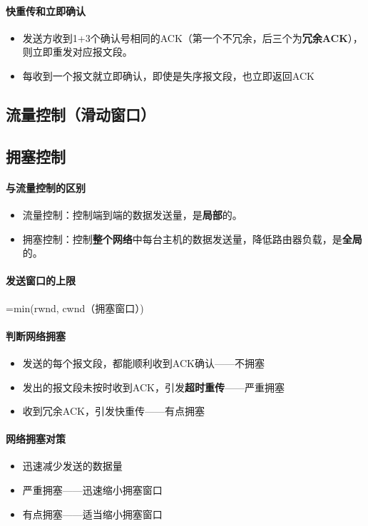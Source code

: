 \paragraph{快重传和立即确认}
\begin{itemize}
    \item 发送方收到1+3个确认号相同的ACK（第一个不冗余，后三个为\textbf{冗余ACK}），则立即重发对应报文段。
    \item 每收到一个报文就立即确认，即使是失序报文段，也立即返回ACK
\end{itemize}


\subsection{流量控制（滑动窗口）}


\subsection{拥塞控制}

\paragraph{与流量控制的区别}
\begin{itemize}
    \item 流量控制：控制端到端的数据发送量，是\textbf{局部}的。
    \item 拥塞控制：控制\textbf{整个网络}中每台主机的数据发送量，降低路由器负载，是\textbf{全局}的。
\end{itemize}

\paragraph{发送窗口的上限}
=min(rwnd, cwnd（拥塞窗口）)

\paragraph{判断网络拥塞}
\begin{itemize}
    \item 发送的每个报文段，都能顺利收到ACK确认——不拥塞
    \item 发出的报文段未按时收到ACK，引发\textbf{超时重传}——严重拥塞
    \item 收到冗余ACK，引发快重传——有点拥塞
\end{itemize}

\paragraph{网络拥塞对策}
\begin{itemize}
    \item 迅速减少发送的数据量
    \item 严重拥塞——迅速缩小拥塞窗口
    \item 有点拥塞——适当缩小拥塞窗口
\end{itemize}

